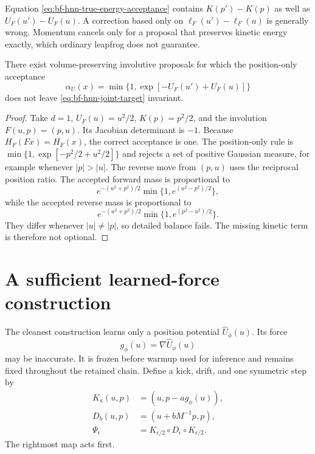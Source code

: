 \begin{remark}
Equation \eqref{eq:bf-hnn-true-energy-acceptance} contains
$K(p')-K(p)$ as well as $U_F(u')-U_F(u)$.  A correction based only on
$\ell_F(u')-\ell_F(u)$ is generally wrong.  Momentum cancels only for a
proposal that preserves kinetic energy exactly, which ordinary leapfrog does
not guarantee.
\end{remark}

\begin{proposition}
\label{prop:bf-hnn-kinetic-required}
There exist volume-preserving involutive proposals for which the
position-only acceptance
\begin{equation}
 \alpha_U(x)=\min\{1,\exp[-U_F(u')+U_F(u)]\}
 \end{equation}
does not leave \eqref{eq:bf-hnn-joint-target} invariant.
\end{proposition}

\begin{proof}
Take $d=1$, $U_F(u)=u^2/2$, $K(p)=p^2/2$, and the involution
$F(u,p)=(p,u)$.  Its Jacobian determinant is $-1$.  Because
$H_F(Fx)=H_F(x)$, the correct acceptance is one.  The position-only rule is
$\min\{1,\exp[-p^2/2+u^2/2]\}$ and rejects a set of positive Gaussian measure,
for example whenever $|p|>|u|$.  The reverse move from $(p,u)$ uses the
reciprocal position ratio.  The accepted forward mass is proportional to
\begin{equation}
 e^{-(u^2+p^2)/2}\min\{1,e^{(u^2-p^2)/2}\},
\end{equation}
while the accepted reverse mass is proportional to
\begin{equation}
 e^{-(u^2+p^2)/2}\min\{1,e^{(p^2-u^2)/2}\}.
\end{equation}
They differ whenever $|u|\ne|p|$, so detailed balance fails.  The missing
kinetic term is therefore not optional.
\end{proof}

\section{A sufficient learned-force construction}
\label{sec:bf-hnn-safe-construction}

The cleanest construction learns only a position potential
$\widehat U_\phi(u)$.  Its force
\begin{equation}
 g_\phi(u)=\nabla\widehat U_\phi(u)
 \label{eq:bf-hnn-learned-force}
\end{equation}
may be inaccurate.  It is frozen before warmup used for inference and remains
fixed throughout the retained chain.  Define a kick, drift, and one symmetric
step by
\begin{align}
 K_{a}(u,p)&=(u,p-a g_\phi(u)),\label{eq:bf-hnn-kick}\\
 D_b(u,p)&=(u+bM^{-1}p,p),\label{eq:bf-hnn-drift}\\
 \Psi_\epsilon&=K_{\epsilon/2}\circ D_\epsilon
                 \circ K_{\epsilon/2}.\label{eq:bf-hnn-kdk}
\end{align}
The rightmost map acts first.

